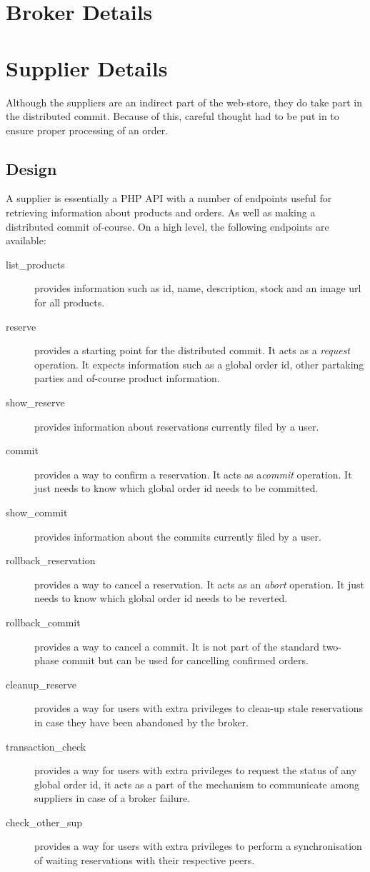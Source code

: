 \documentclass[10pt,a4paper,kul]{kulakarticle} %
\begin{document}
	\section{Broker Details}
	
	\section{Supplier Details}
		Although the suppliers are an indirect part of the web-store, they do take part in the distributed commit. Because of this, careful thought had to be put in to ensure proper processing of an order. 
		\subsection{Design}
			A supplier is essentially a PHP API with a number of endpoints useful for retrieving information about products and orders. As well as making a distributed commit of-course. On a high level, the following endpoints are available:
			\begin{description}
				\item[list\_products] provides information such as id, name, description, stock and an image url for all products. 
				\item[reserve] provides a starting point for the distributed commit. It acts as a \emph{request} operation. It expects information such as a global order id, other partaking parties and of-course product information. 
				\item[show\_reserve] provides information about reservations currently filed by a user.
				\item[commit] provides a way to confirm a reservation. It acts as a\emph{commit} operation. It just needs to know which global order id needs to be committed. 
				\item[show\_commit] provides information about the commits currently filed by a user.
				\item[rollback\_reservation] provides a way to cancel a reservation. It acts as an \emph{abort} operation. It just needs to know which global order id needs to be reverted. 
				\item[rollback\_commit] provides a way to cancel a commit. It is not part of the standard two-phase commit but can be used for cancelling confirmed orders. 
				\item[cleanup\_reserve] provides a way for users with extra privileges to clean-up stale reservations in case they have been abandoned by the broker. 
				\item[transaction\_check] provides a way for users with extra privileges to request the status of any global order id, it acts as a part of the mechanism to communicate among suppliers in case of a broker failure. 
				\item[check\_other\_sup] provides a way for users with extra privileges to perform a synchronisation of waiting reservations with their respective peers.  
			\end{description}
			
\end{document}
